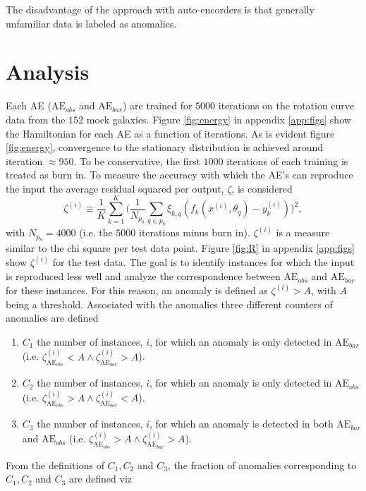 \begin{example}
	The disadvantage of the approach with auto-encorders is that generally unfamiliar data is labeled as anomalies.
	
	
	\section{Analysis}
	Each AE ($\text{AE}_{obs}$ and $\text{AE}_{bar}$) are trained for $5000$ iterations on the rotation curve data from the $152$ mock galaxies. Figure \ref{fig:energy} in appendix \ref{app:figs} show the Hamiltonian for each AE as a function of iterations. As is evident figure \ref{fig:energy}, convergence to the stationary distribution is achieved around iteration $\approx 950$. To be conservative, the first $1000$ iterations of each training is treated as burn in. To measure the accuracy with which the AE's can reproduce the input the average residual squared per output, $\zeta$, is considered  
	\begin{equation}
		\zeta^{(i)}\equiv\frac{1}{K}\sum_{k=1}^{K}\bigg(\frac{1}{N_{p_8}}\sum_{q\in p_8}\xi_{k,q}(f_k(x^{(i)},\theta_q)-y^{(i)}_k)\bigg)^2,
		\label{R}
	\end{equation}
	with $N_{p_8}=4000$ (i.e. the $5000$ iterations minus burn in). $\zeta^{(i)}$ is a measure similar to the chi square per test data point. Figure \ref{fig:R} in appendix \ref{app:figs} show $\zeta^{(i)}$ for the test data. The goal is to identify instances for which the input is reproduced less well and analyze the correspondence between $\text{AE}_{obs}$ and $\text{AE}_{bar}$ for these instances. For this reason, an anomaly is defined as $\zeta^{(i)}> A$, with $A$ being a threshold. Associated with the anomalies three different counters of anomalies are defined
	\begin{enumerate}
		\item $C_1$ the number of instances, $i$, for which an anomaly is only detected in $\text{AE}_{bar}$ (i.e. $\zeta_{\text{AE}_{obs}}^{(i)}<A\wedge \zeta_{\text{AE}_{bar}}^{(i)}>A$).
		\item $C_2$ the number of instances, $i$, for which an anomaly is only detected in $\text{AE}_{obs}$ (i.e. $\zeta_{\text{AE}_{obs}}^{(i)}>A\wedge \zeta_{\text{AE}_{bar}}^{(i)}<A$). 
		\item $C_3$ the number of instances, $i$, for which an anomaly is detected in both $\text{AE}_{bar}$ and $\text{AE}_{obs}$ (i.e. $\zeta_{\text{AE}_{obs}}^{(i)}>A\wedge \zeta_{\text{AE}_{bar}}^{(i)}>A$).  
	\end{enumerate}
	From the definitions of $C_1,C_2$ and $C_3$, the fraction of anomalies corresponding to $C_1,C_2$ and $C_3$ are defined viz

\end{example}
